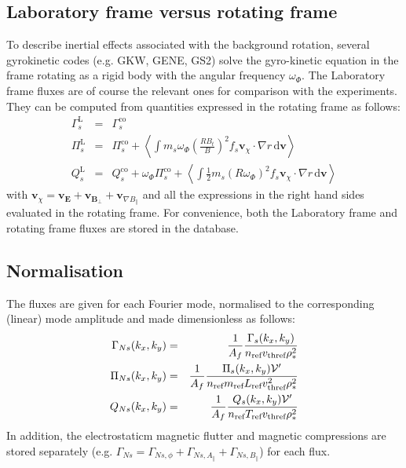 \documentclass[fleqn]{report}
\begin{document}
\subsection{Laboratory frame versus rotating frame}
To describe inertial effects associated with the background rotation, several gyrokinetic codes (e.g. GKW, GENE, GS2) solve the gyro-kinetic equation in the frame rotating as a rigid body with the angular frequency $\omega_\Phi$. The Laboratory frame fluxes are of course the relevant ones for comparison with the experiments. They can be computed from quantities expressed in the rotating frame as follows:
\begin{eqnarray}
\Gamma_s^\textrm{L} &=& \Gamma_s^\textrm{co} \\
\Pi_s^\textrm{L} &=& \Pi_s^\textrm{co} + \left< \int m_s\omega_\Phi\left(\frac{RB_t}{B}\right)^2 f_s \mathbf{v}_\chi\cdot \nabla r  \,\textrm{d}\mathbf{v}\right>\\
Q_s^\textrm{L} &=& Q_s^\textrm{co} + \omega_\Phi \Pi_s^\textrm{co}
+ \left< \int \frac{1}{2}m_s(R\omega_\Phi)^2 f_s  \mathbf{v}_\chi\cdot \nabla r \,\textrm{d}\mathbf{v}\right> 
\end{eqnarray}
with $\mathbf{v}_\chi=\mathbf{v}_\mathbf{E} + \mathbf{v}_{\mathbf{B}_\perp}+ \mathbf{v}_{\nabla B_\parallel}$ and all the expressions in the right hand sides evaluated in the rotating frame.
For convenience, both the Laboratory frame and rotating frame fluxes are stored in the database. 


\subsection{Normalisation}
The fluxes are given for each Fourier mode, normalised to the corresponding (linear) mode amplitude and made dimensionless as follows:
\begin{eqnarray}
 \Gamma_{Ns}(k_x,k_y) &=& \frac{1}{A_f}\frac{\Gamma_s(k_x,k_y)}{n_{\textrm{ref}} v_\textrm{thref} \rho_*^2}\\
 \Pi_{Ns}(k_x,k_y) &=& \frac{1}{A_f}\frac{\Pi_s(k_x,k_y)\mathcal{V}'}{n_{\textrm{ref}} m_{\textrm{ref}} L_{\textrm{ref}} v_\textrm{thref}^2 \rho_*^2}\\
 Q_{Ns}(k_x,k_y) &=& \frac{1}{A_f}\frac{Q_s(k_x,k_y)\mathcal{V}'}{n_{\textrm{ref}} T_{\textrm{ref}} v_\textrm{thref} \rho_*^2}
\end{eqnarray}
In addition, the electrostaticm magnetic flutter and magnetic compressions are stored separately (e.g. $\Gamma_{Ns}=\Gamma_{Ns,\phi}+\Gamma_{Ns,A_\parallel}+\Gamma_{Ns,B_\parallel}$) for each flux. 
\end{document}
